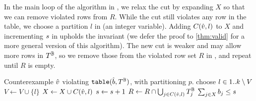 \documentclass[a4paper,UKenglish,cleveref,autoref,thm-restate]{lipics-v2021}
\begin{document}
In the main loop of the algorithm in , we relax the cut by expanding $X$ so that we can remove violated rows from $R$.
While the cut still violates any row in the table, we choose a partition $l$ in  (\ie an integer variable).
Adding $C(\hat{v},l)$ to $X$ and incrementing $s$ in  upholds the invariant (we defer the proof to \cref{thm:valid} for a more general version of this algorithm).
The new cut is weaker and may allow more rows in $T^{\mathbb{B}}$, so we remove those from the violated row set $R$ in , and repeat until $R$ is empty.

\begin{algorithm}
\caption{The \lazyGenerate algorithm for Boolean table constraints of $\rows$ rows and $\cols$ columns.}
\label{lst:generate}
\begin{algorithmic}[1]
    \Require Counterexample $\hat{v}$ violating $\texttt{table}(\hat{b},T^{\mathbb{B}})$, with partitioning $p$. 
    \codeBlockDelim
    \Function{\lazyGenerate}{$\generateInitArgs$}
        \State \Return {} \label{lst:generate:initialize}
    \EndFunction
    \codeBlockDelim
    \Function{\lazyGenerate}{$\generateArgs$}
        \label{lst:generate:while:start}
            \State choose $l \in 1..k \setminus V$  \label{lst:generate:choose}
            \State $V \gets V \cup \{l\}$
            \label{lst:generate:updateV}
            \State $X \gets X \cup C(\hat{v}, l)$
            \label{lst:generate:updateX}
            \State $s \gets s + 1$
            \label{lst:generate:updateRhs}
            \State $R \gets R \cap \bigcup_{j \in C(\hat{v}, l)}{T^{\mathbb{B}}_j}$
            \label{lst:generate:updateR}
        \EndWhile\label{lst:generate:while:end}
        \State \Return $\sum_{j \in X} b_j \leq s$
        \label{lst:generate:return}
    \EndFunction
\end{algorithmic}
\end{algorithm}
\end{document}
